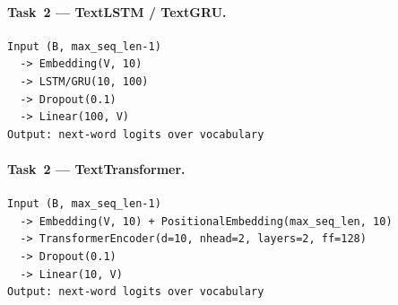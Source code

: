 \documentclass[11pt,letterpaper]{article}
\begin{document}
\paragraph{Task~2 --- TextLSTM / TextGRU.}
\begin{verbatim}
Input (B, max_seq_len-1)
  -> Embedding(V, 10)
  -> LSTM/GRU(10, 100)
  -> Dropout(0.1)
  -> Linear(100, V)
Output: next-word logits over vocabulary
\end{verbatim}

\paragraph{Task~2 --- TextTransformer.}
\begin{verbatim}
Input (B, max_seq_len-1)
  -> Embedding(V, 10) + PositionalEmbedding(max_seq_len, 10)
  -> TransformerEncoder(d=10, nhead=2, layers=2, ff=128)
  -> Dropout(0.1)
  -> Linear(10, V)
Output: next-word logits over vocabulary
\end{verbatim}
\end{document}
